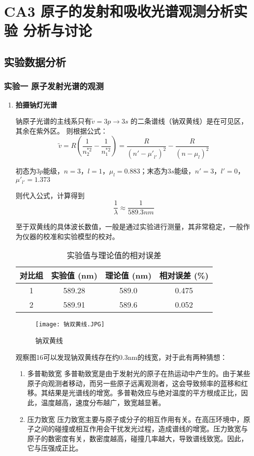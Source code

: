 \documentclass[dvipsnames, svgnames,a4paper,11pt]{article}
\begin{document}
	\section{CA3 \quad 原子的发射和吸收光谱观测分析实验 \quad\heiti 分析与讨论}
	
	\subsection{实验数据分析}
	\subsubsection{实验一 \quad 原子发射光谱的观测}
	\begin{enumerate}
		\item \textbf{拍摄钠灯光谱}
		
		
			
			
			钠原子光谱的主线系只有$\widetilde{v}=3p \rightarrow 3s$ 的二条谱线（钠双黄线）是在可见区，其余在紫外区。
			则根据公式：
			\[
			\widetilde{v}=R(\frac{1}{n_2^{*2}}-\frac{1}{n_1^{*2}})=\frac{R}{{(n'-{\mu'}_{l'})}^2}-\frac{R}{{(n-\mu_l)}^2}
			\]
			
			初态为$3p$能级，$n=3$，$l=1$，$\mu_l=0.883$；末态为$3s$能级，$n'=3$，$l'=0$，$\mu'_{l'}=1.373$
			
			则代入公式，计算得到
			\[ \frac{1}{\lambda}\approx\frac{1}{589.3nm}
			\]
			
			至于双黄线的具体波长数值，一般是通过实验进行测量，其非常稳定，一般作为仪器的校准和实验模型的校对。

			\begin{table}[H]
				\centering
				\caption{实验值与理论值的相对误差}
				\begin{tabular}{|c|c|c|c|}
				\hline
				对比组 & 实验值 (nm) & 理论值 (nm) & 相对误差 (\%) \\
				\hline
				1 & 589.28 & 589.0 & 0.475 \\
				2 & 589.91 & 589.6 & 0.052 \\
				\hline
				\end{tabular}
				\end{table}
				\begin{figure}[{H}]
					\centering
					\texttt{[image: 钠双黄线.JPG]}
					\caption{钠双黄线}
					\label{}
				\end{figure}
				观察图16可以发现钠双黄线存在约0.3nm的线宽，对于此有两种猜想：
				\begin{enumerate}
					\item 多普勒致宽 \quad 多普勒致宽是由于发射光的原子在热运动中产生的。由于某些原子向观测者移动，而另一些原子远离观测者，这会导致频率的蓝移和红移。其结果是光谱线的增宽。多普勒效应与绝对温度的平方根成正比，因此，温度越高，速度分布越广，致宽越显著。
					\item 压力致宽 \quad 压力致宽主要与原子或分子的相互作用有关。在高压环境中，原子之间的碰撞或相互作用会干扰发光过程，造成谱线的增宽。压力致宽与原子的数密度有关，数密度越高，碰撞几率越大，导致谱线致宽。因此，它与压强成正比。
					




\end{enumerate}
\end{enumerate}
\end{document}
